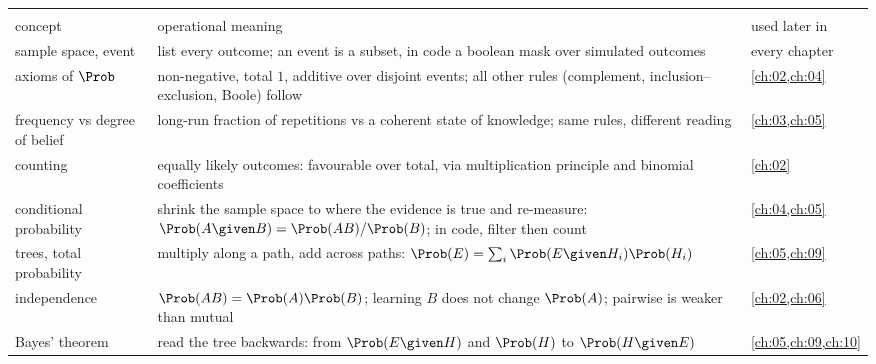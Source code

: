 \begin{center}
\small
\renewcommand{\arraystretch}{1.15}
\begin{tabularx}{\linewidth}{@{}>{\raggedright\arraybackslash}p{3.3cm}
                               >{\raggedright\arraybackslash}X
                               >{\raggedright\arraybackslash}p{2.7cm}@{}}
\toprule
\multicolumn{3}{@{}l}{\textbf{Events and their probabilities}}\\
concept & operational meaning & used later in\\\midrule
sample space, event & list every outcome; an event is a subset, in code a
  boolean mask over simulated outcomes & every chapter\\
axioms of $\Prob$ & non-negative, total $1$, additive over disjoint events;
  all other rules (complement, inclusion--exclusion, Boole) follow &
  \cref{ch:02,ch:04}\\
frequency vs degree of belief & long-run fraction of repetitions vs a
  coherent state of knowledge; same rules, different reading &
  \cref{ch:03,ch:05}\\
counting & equally likely outcomes: favourable over total, via
  multiplication principle and binomial coefficients & \cref{ch:02}\\
conditional probability & shrink the sample space to where the evidence is
  true and re-measure: $\Prob(A\given B)=\Prob(AB)/\Prob(B)$; in code, filter
  then count & \cref{ch:04,ch:05}\\
trees, total probability & multiply along a path, add across paths:
  $\Prob(E)=\sum_i\Prob(E\given H_i)\Prob(H_i)$ & \cref{ch:05,ch:09}\\
independence & $\Prob(AB)=\Prob(A)\Prob(B)$; learning $B$ does not change
  $\Prob(A)$; pairwise is weaker than mutual & \cref{ch:02,ch:06}\\
Bayes' theorem & read the tree backwards: from $\Prob(E\given H)$ and
  $\Prob(H)$ to $\Prob(H\given E)$ & \cref{ch:05,ch:09,ch:10}\\
\bottomrule
\end{tabularx}
\end{center}
\newpage

